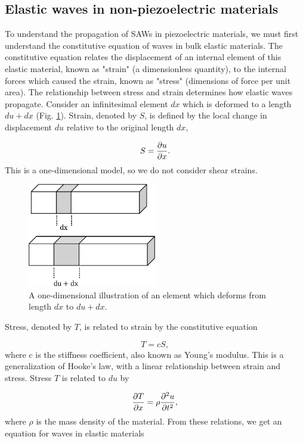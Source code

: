 \documentclass[double,12pt,1in]{beavtex}
\begin{document}
\subsection{Elastic waves in non-piezoelectric materials}
To understand the propagation of SAWs in piezoelectric materials, we must first understand the constitutive equation of waves in bulk elastic materials. The constitutive equation relates the displacement of an internal element of this elastic material, known as "strain" (a dimensionless quantity), to the internal forces which caused the strain, known as "stress" (dimensions of force per unit area). The relationship between stress and strain determines how elastic waves propagate. Consider an infinitesimal element $dx$ which is deformed to a length $du + dx$ (Fig. \ref{dfield}). Strain, denoted by $S$, is defined by the local change in displacement $du$ relative to the original length $dx$, 

\begin{equation}
    S = \pdv{u}{x}. \label{strain-displacement equation}
\end{equation}
This is a one-dimensional model, so we do not consider shear strains.
\begin{figure}
    \includegraphics[width = 0.5\textwidth]{displacement field.pdf}
    \caption{A one-dimensional illustration of an element which deforms from length $dx$ to $du + dx$.} \label{dfield}
\end{figure}
Stress, denoted by $T$, is related to strain by the constitutive equation

\begin{equation}
    T = cS, \label{elastic Hooke's}
\end{equation}
where c is the stiffness coefficient, also known as Young's modulus. This is a generalization of Hooke's law, with a linear relationship between strain and stress. Stress $T$ is related to $du$ by 

\begin{equation}
    \pdv{T}{x} = \rho \pdv[2]{u}{t}, \label{stress related to displacement}
\end{equation}
where $\rho$ is the mass density of the material. From these relations, we get an equation for waves in elastic materials
\end{document}
